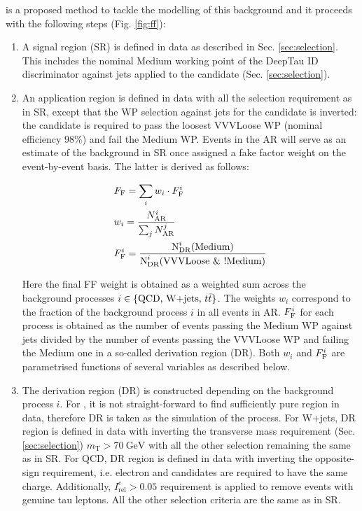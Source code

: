 \ff is a proposed method to tackle the modelling of this background and it proceeds with the following steps (Fig. \ref{fig:ff}):
\begin{enumerate}
    \item A signal region (SR) is defined in data as described in Sec. \ref{sec:selection}. This includes the nominal Medium working point of the DeepTau ID discriminator against jets applied to the \tauh candidate (Sec. \ref{sec:selection}).
    
    \item An application region is defined in data with all the selection requirement as in SR, except that the WP selection against jets for the \tauh candidate is inverted: the candidate is required to pass the loosest VVVLoose WP (nominal \tauh efficiency $98\%$) and fail the Medium WP. Events in the AR will serve as an estimate of the \jtt background in SR once assigned a fake factor weight \ff on the event-by-event basis. The latter is derived as follows:
    
    \begin{align}
        &F_\text{F} = \sum_{i}w_i \cdot F_\text{F}^i\\ \label{eq:ff}
        &w_i = \dfrac{N^i_\text{AR}}{\sum_j N^j_\text{AR}}\\ \label{eq:ff_fr}
        & F_\text{F}^i = \dfrac{\text{N}_{\text{DR}}^i(\text{Medium})}{\text{N}_{\text{DR}}^i(\text{VVVLoose} ~\& ~!\text{Medium})}
    \end{align}

    Here the final FF weight is obtained as a weighted sum across the \jtt background processes $i \in \{\text{QCD, W+jets, } t\bar{t}\}$. The weights $w_i$ correspond to the fraction of the background process $i$ in all \jtt events in AR. $F_\text{F}^i$ for each process is obtained as the number of events passing the Medium WP against jets divided by the number of events passing the VVVLoose WP and failing the Medium one in a so-called derivation region (DR). Both $w_i$ and $F_\text{F}^i$ are parametrised functions of several variables as described below. 
    
    \item The derivation region (DR) is constructed depending on the background process $i$. For \ttbar, it is not straight-forward to find sufficiently pure region in data, therefore DR is taken as the simulation of the \ttbar process. For W+jets, DR region is defined in data with inverting the transverse mass requirement (Sec. \ref{sec:selection}) $m_\text{T} > 70 ~\text{GeV}$ with all the other selection remaining the same as in SR. For QCD, DR region is defined in data with inverting the opposite-sign requirement, i.e. electron and \tauh candidates are required to have the same charge. Additionally, $I^e_{\text{rel}} > 0.05$ requirement is applied to remove events with genuine tau leptons. All the other selection criteria are the same as in SR.
    

\end{enumerate}
